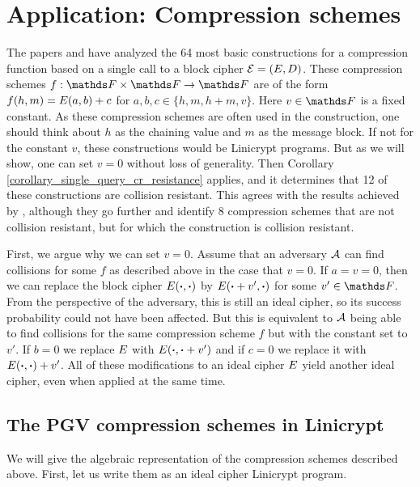 \section{Application: Compression schemes}

The papers \cite{C:BlaRogShr02} and \cite{C:PreGovVan93} have analyzed the 64 most basic constructions for a compression function
based on a single call to a block cipher $\mathcal{E} = (E, D)$.
These compression schemes $f: \F \times \F \to \F$ are of the form $f(h, m) = E(a, b) + c$ for $a,b,c \in \{h, m, h+m, v\}$.
Here $v \in \F$ is a fixed constant.
As these compression schemes are often used in the \MD construction,
one should think about $h$ as the chaining value and $m$ as the message block.
If not for the constant $v$, these constructions would be Linicrypt programs.
But as we will show, one can set $v=0$ without loss of generality.
Then Corollary \ref{corollary_single_query_cr_resistance} applies,
and it determines that 12 of these constructions are collision resistant.
This agrees with the results achieved by \cite{C:BlaRogShr02},
although they go further and identify 8 compression schemes that are not collision resistant,
but for which the \MD construction is collision resistant.

First, we argue why we can set $v=0$.
Assume that an adversary $\mathcal{A}$ can find collisions for some $f$ as described above in the case that $v=0$.
If $a = v = 0$, then we can replace the block cipher $E(\boldsymbol\cdot, \boldsymbol\cdot)$ by $E(\boldsymbol\cdot + v', \boldsymbol\cdot)$ for some $v' \in \F$.
From the perspective of the adversary,
this is still an ideal cipher,
so its success probability could not have been affected.
But this is equivalent to $\mathcal{A}$ being able to find collisions for the same compression scheme $f$ but with the constant set to $v'$.
If $b=0$ we replace $E$ with $E(\boldsymbol\cdot, \boldsymbol\cdot + v')$ and if $c=0$ we replace it with $E(\boldsymbol\cdot, \boldsymbol\cdot) + v'$.
All of these modifications to an ideal cipher $E$ yield another ideal cipher,
even when applied at the same time.

\subsection{The PGV compression schemes in Linicrypt}
We will give the algebraic representation of the compression schemes described above.
First, let us write them as an ideal cipher Linicrypt program. 

